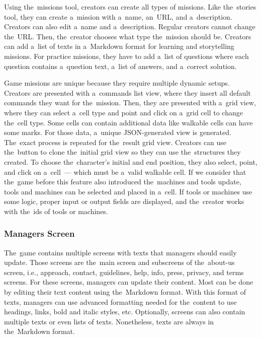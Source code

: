 Using the~missions tool, creators can create all types of missions.
Like the~stories tool, they can create a~mission with a~name, an~URL, and a~description.
Creators can also edit a~name and a~description.
Regular creators cannot change the~URL.
Then, the~creator chooses what type the~mission should be.
Creators can add a~list of texts in a~Markdown format for learning and storytelling missions.
For practice missions, they have to add a~list of questions where each question contains a~question text, a~list of answers, and a~correct solution.  

Game missions are unique because they require multiple dynamic setups.
Creators are presented with a~commands list view, where they insert all default commands they want for the~mission.
Then, they are presented with a~grid view, where they can select a~cell type and point and click on a~grid cell to change the~cell type.
Some cells can contain additional data like walkable cells can have some marks.
For those data, a~unique JSON-generated view is generated.
The~exact process is repeated for the~result grid view.
Creators can use the~button to clone the~initial grid view so they can use the~structures they created.
To choose the~character's initial and end position, they also select, point, and click on a~cell~--- which must be a~valid walkable cell.
If we consider that the~game before this feature also introduced the~machines and tools update, tools and machines can be selected and placed in a~cell.
If tools or machines use some logic, proper input or output fields are displayed, and the~creator works with the~ids of tools or machines.

\subsubsection{Managers Screen}

The~game contains multiple screens with texts that managers should \mbox{easily} update.
Those screens are the~main screen and subscreens of the~about-us screen, i.e., approach, contact, guidelines, help, info, press, privacy, and terms screens.
For these screens, managers can update their content.
Most can be done by editing their text content using the~Markdown format.
With this format of texts, managers can use advanced formatting needed for the~content to use headings, links, bold and italic styles, etc.
Optionally, screens can also contain multiple texts or even lists of texts.
Nonetheless, texts are always in the~Markdown format.

